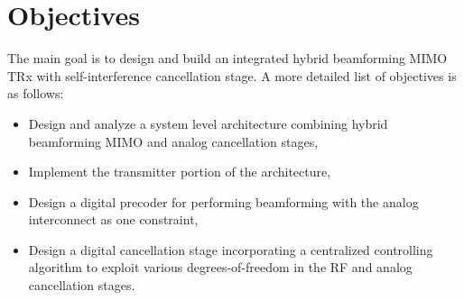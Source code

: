 \documentclass[onecolumn,draftcls,journal]{IEEEtran}
\begin{document}
\section{ Objectives}
\vspace{-.1in}
The main goal is to design and build an integrated hybrid beamforming MIMO TRx with self-interference cancellation stage.
A more detailed list of objectives is as follows:
\begin{itemize}
\item Design and analyze a system level architecture combining hybrid beamforming MIMO and analog cancellation stages, 
\item Implement the transmitter portion of the architecture,%
\item Design a digital precoder for performing beamforming with the analog interconnect as one constraint,
\item Design a digital cancellation stage incorporating a centralized controlling algorithm to exploit various degrees-of-freedom in the RF and analog cancellation stages.
\end{itemize}



%
\end{document}

